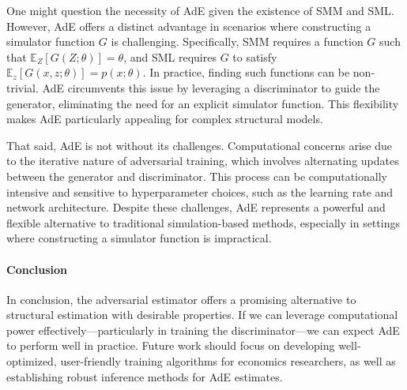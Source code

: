 \documentclass[12pt]{article}
\begin{document}
One might question the necessity of AdE given the existence of SMM and SML.
However, AdE offers a distinct advantage in scenarios where constructing a
simulator function \(G\) is challenging. Specifically, SMM requires a function
\(G\) such that \(\mathbb{E}_Z[G(Z; \theta)] = \theta\), and SML requires \(G\)
to satisfy \(\mathbb{E}_z[G(x, z; \theta)] = p(x; \theta)\). In practice,
finding such functions can be non-trivial. AdE circumvents this issue by
leveraging a discriminator to guide the generator, eliminating the need for an
explicit simulator function. This flexibility makes AdE particularly appealing
for complex structural models.

That said, AdE is not without its challenges. Computational concerns arise due
to the iterative nature of adversarial training, which involves alternating
updates between the generator and discriminator. This process can be
computationally intensive and sensitive to hyperparameter choices, such as the
learning rate and network architecture. Despite these challenges, AdE
represents a powerful and flexible alternative to traditional simulation-based
methods, especially in settings where constructing a simulator function is
impractical.

\paragraph{Conclusion}
In conclusion, the adversarial estimator offers a promising alternative to
structural estimation with desirable properties. If we can leverage
computational power effectively—particularly in training the discriminator—we
can expect AdE to perform well in practice. Future work should focus on
developing well-optimized, user-friendly training algorithms for economics
researchers, as well as establishing robust inference methods for AdE
estimates.

\pagebreak
\newpage

\end{document}

